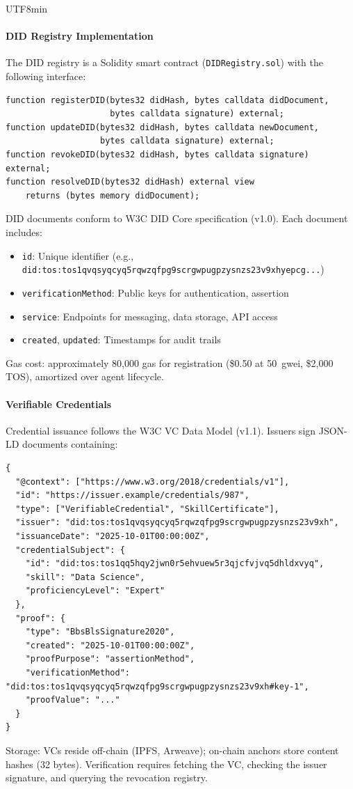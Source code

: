 \documentclass[11pt]{article}
\begin{document}
\begin{CJK}{UTF8}{min}
\paragraph{DID Registry Implementation} The DID registry is a Solidity smart contract (\texttt{DIDRegistry.sol}) with the following interface:
\begin{verbatim}
function registerDID(bytes32 didHash, bytes calldata didDocument,
                     bytes calldata signature) external;
function updateDID(bytes32 didHash, bytes calldata newDocument,
                   bytes calldata signature) external;
function revokeDID(bytes32 didHash, bytes calldata signature) external;
function resolveDID(bytes32 didHash) external view
    returns (bytes memory didDocument);
\end{verbatim}
DID documents conform to W3C DID Core specification (v1.0). Each document includes:
\begin{itemize}[noitemsep]
  \item \texttt{id}: Unique identifier (e.g., \texttt{did:tos:tos1qvqsyqcyq5rqwzqfpg9scrgwpugpzysnzs23v9xhyepcg...})
  \item \texttt{verificationMethod}: Public keys for authentication, assertion
  \item \texttt{service}: Endpoints for messaging, data storage, API access
  \item \texttt{created}, \texttt{updated}: Timestamps for audit trails
\end{itemize}
Gas cost: approximately 80,000 gas for registration (\$0.50 at 50~gwei, \$2,000 TOS), amortized over agent lifecycle.

\paragraph{Verifiable Credentials} Credential issuance follows the W3C VC Data Model (v1.1). Issuers sign JSON-LD documents containing:
\begin{verbatim}
{
  "@context": ["https://www.w3.org/2018/credentials/v1"],
  "id": "https://issuer.example/credentials/987",
  "type": ["VerifiableCredential", "SkillCertificate"],
  "issuer": "did:tos:tos1qvqsyqcyq5rqwzqfpg9scrgwpugpzysnzs23v9xh",
  "issuanceDate": "2025-10-01T00:00:00Z",
  "credentialSubject": {
    "id": "did:tos:tos1qq5hqy2jwn0r5ehvuew5r3qjcfvjvq5dhldxvyq",
    "skill": "Data Science",
    "proficiencyLevel": "Expert"
  },
  "proof": {
    "type": "BbsBlsSignature2020",
    "created": "2025-10-01T00:00:00Z",
    "proofPurpose": "assertionMethod",
    "verificationMethod": "did:tos:tos1qvqsyqcyq5rqwzqfpg9scrgwpugpzysnzs23v9xh#key-1",
    "proofValue": "..."
  }
}
\end{verbatim}
Storage: VCs reside off-chain (IPFS, Arweave); on-chain anchors store content hashes (32 bytes). Verification requires fetching the VC, checking the issuer signature, and querying the revocation registry.


\end{CJK}
\end{document}
